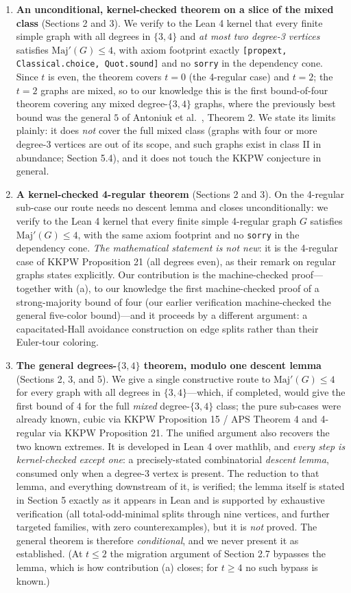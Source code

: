 \documentclass[11pt]{article}
\theoremstyle{definition}
\theoremstyle{remark}
\newcommand{\Maj}{\ensuremath{\mathrm{Maj}'}}
\begin{document}
\begin{enumerate}
\def\labelenumi{(\alph{enumi})}
\item
  \textbf{An unconditional, kernel-checked theorem on a slice of the mixed class} (Sections 2 and 3). We verify to the Lean 4 kernel that every finite simple graph with all degrees in $\{3,4\}$ and \emph{at most two degree-3 vertices} satisfies $\Maj(G) \le 4$, with axiom footprint exactly \texttt{[propext, Classical.choice, Quot.sound]} and no \texttt{sorry} in the dependency cone. Since $t$ is even, the theorem covers $t = 0$ (the 4-regular case) and $t = 2$; the $t = 2$ graphs are mixed, so to our knowledge this is the first bound-of-four theorem covering any mixed degree-$\{3,4\}$ graphs, where the previously best bound was the general $5$ of Antoniuk et al.\ \cite{APS}, Theorem 2. We state its limits plainly: it does \emph{not} cover the full mixed class (graphs with four or more degree-3 vertices are out of its scope, and such graphs exist in class II in abundance; Section 5.4), and it does not touch the KKPW conjecture in general.
\item
  \textbf{A kernel-checked 4-regular theorem} (Sections 2 and 3). On the 4-regular sub-case our route needs no descent lemma and closes unconditionally: we verify to the Lean 4 kernel that every finite simple 4-regular graph $G$ satisfies $\Maj(G) \le 4$, with the same axiom footprint and no \texttt{sorry} in the dependency cone. \emph{The mathematical statement is not new}: it is the 4-regular case of KKPW Proposition 21 (all degrees even), as their remark on regular graphs states explicitly. Our contribution is the machine-checked proof---together with (a), to our knowledge the first machine-checked proof of a strong-majority bound of four (our earlier verification \cite{E5} machine-checked the general five-color bound)---and it proceeds by a different argument: a capacitated-Hall avoidance construction on edge splits rather than their Euler-tour coloring.
\item
  \textbf{The general degrees-$\{3,4\}$ theorem, modulo one descent lemma} (Sections 2, 3, and 5). We give a single constructive route to $\Maj(G) \le 4$ for every graph with all degrees in $\{3,4\}$---which, if completed, would give the first bound of $4$ for the full \emph{mixed} degree-$\{3,4\}$ class; the pure sub-cases were already known, cubic via KKPW Proposition 15 / APS Theorem 4 and 4-regular via KKPW Proposition 21. The unified argument also recovers the two known extremes. It is developed in Lean 4 over mathlib, and \emph{every step is kernel-checked except one}: a precisely-stated combinatorial \emph{descent lemma}, consumed only when a degree-3 vertex is present. The reduction to that lemma, and everything downstream of it, is verified; the lemma itself is stated in Section 5 exactly as it appears in Lean and is supported by exhaustive verification (all total-odd-minimal splits through nine vertices, and further targeted families, with zero counterexamples), but it is \emph{not} proved. The general theorem is therefore \emph{conditional}, and we never present it as established. (At $t \le 2$ the migration argument of Section 2.7 bypasses the lemma, which is how contribution (a) closes; for $t \ge 4$ no such bypass is known.)

\end{enumerate}
\end{document}
